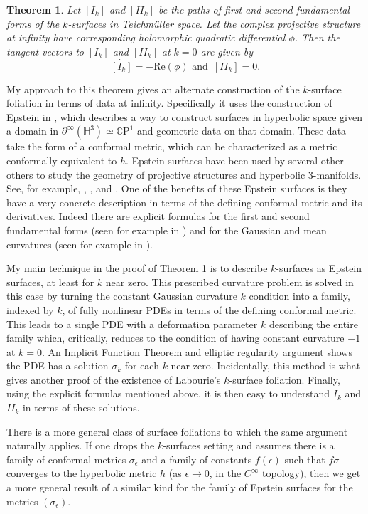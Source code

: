 \documentclass[11pt]{amsart}
\newcommand{\CP}{\mathbb{C}\mathrm{P}}
\renewcommand{\H}{\mathbb{H}}
\newtheorem{thm}{Theorem}[section]
\begin{document}
\begin{thm}
\label{k-surfaces-thm}
Let $[I_k]$ and $[I\!I_k]$ be the paths of first and second fundamental forms of the $k$-surfaces in Teichm\"uller space. 
Let the complex projective structure at infinity have corresponding holomorphic quadratic differential $\phi$. 
Then the tangent vectors to $[I_k]$ and $[I\!I_k]$ at $k=0$ are given by
\[
\dot{[I_k]} = -\mathrm{Re}(\phi) \text{ and } \, \dot{[I\!I_k]} = 0.
\]
\end{thm}

My approach to this theorem gives an alternate construction of the $k$-surface foliation in terms of data at infinity.  
Specifically it uses the construction of Epstein in \cite{epstein1984}, which describes a way to construct surfaces in hyperbolic space given a domain in $\partial^\infty(\H^3) \simeq \CP^1$ and geometric data on that domain. 
These data take the form of a conformal metric, which can be characterized as a metric conformally equivalent to $h$.  
Epstein surfaces have been used by several other others to study the geometry of projective structures and hyperbolic 3-manifolds. 
See, for example, \cite{anderson1998}, \cite{bromberg2004}, and \cite{krasnov-schlenker2008}. 
One of the benefits of these Epstein surfaces is they have a very concrete description in terms of the defining conformal metric and its derivatives. 
Indeed there are explicit formulas for the first and second fundamental forms (seen for example in \cite{dumas2017}) and for the Gaussian and mean curvatures (seen for example in \cite{quinn2020}). 

My main technique in the proof of Theorem \ref{k-surfaces-thm} is to describe $k$-surfaces as Epstein surfaces, at least for $k$ near zero. 
This prescribed curvature problem is solved in this case by turning the constant Gaussian curvature $k$ condition into a family, indexed by $k$, of fully nonlinear PDEs in terms of the defining conformal metric. 
This leads to a single PDE with a deformation parameter $k$ describing the entire family which, critically, reduces to the condition of having constant curvature $-1$ at $k=0$. 
An Implicit Function Theorem and elliptic regularity argument shows the PDE has a solution $\sigma_k$ for each $k$ near zero. 
Incidentally, this method is what gives another proof of the existence of Labourie's $k$-surface foliation. 
Finally, using the explicit formulas mentioned above, it is then easy to understand $I_k$ and $I\!I_k$ in terms of these solutions. 


There is a more general class of surface foliations to which the same argument naturally applies. 
If one drops the $k$-surfaces setting and assumes there is a family of conformal metrics $\sigma_\epsilon$ and a family of constants $f(\epsilon)$ such that $f\sigma$ converges to the hyperbolic metric $h$ (as $\epsilon \to 0$, in the $C^\infty$ topology), then we get a more general result of a similar kind for the family of Epstein surfaces for the metrics $(\sigma_\epsilon)$. 
\end{document}
